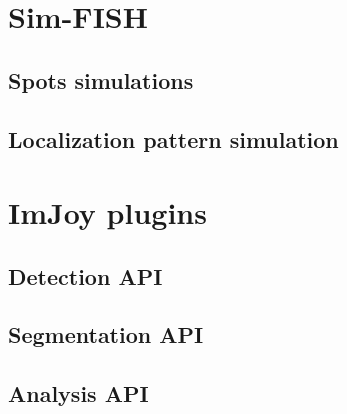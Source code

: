 \section{Sim-FISH}


\subsection{Spots simulations}

\subsection{Localization pattern simulation}


\section{ImJoy plugins}


\subsection{Detection API}

\subsection{Segmentation API}

\subsection{Analysis API}
